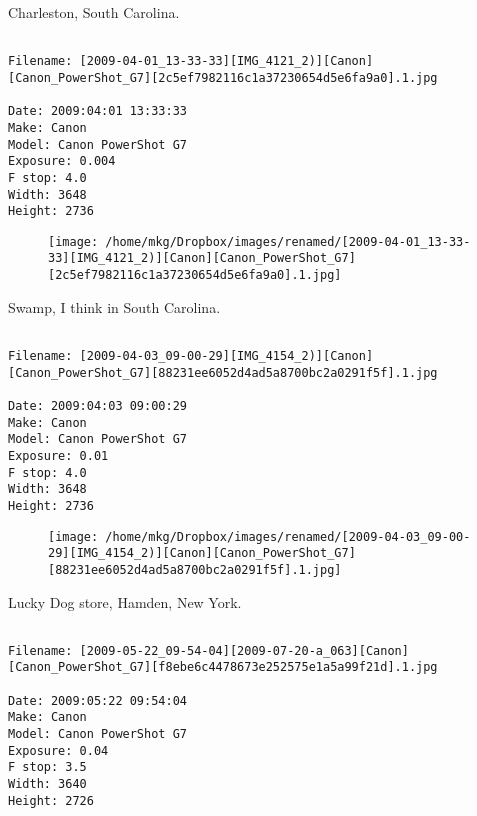 \clearpage
\onecolumn
\noindent Charleston, South Carolina.
\noindent
\begin{lstlisting}

Filename: [2009-04-01_13-33-33][IMG_4121_2)][Canon][Canon_PowerShot_G7][2c5ef7982116c1a37230654d5e6fa9a0].1.jpg

Date: 2009:04:01 13:33:33
Make: Canon
Model: Canon PowerShot G7
Exposure: 0.004
F stop: 4.0
Width: 3648
Height: 2736
\end{lstlisting}
\clearpage

\begin{figure}
\texttt{[image: /home/mkg/Dropbox/images/renamed/[2009-04-01\_13-33-33][IMG\_4121\_2)][Canon][Canon\_PowerShot\_G7][2c5ef7982116c1a37230654d5e6fa9a0].1.jpg]}
\end{figure}
    
\clearpage
\onecolumn
\noindent Swamp, I think in South Carolina.
\noindent
\begin{lstlisting}

Filename: [2009-04-03_09-00-29][IMG_4154_2)][Canon][Canon_PowerShot_G7][88231ee6052d4ad5a8700bc2a0291f5f].1.jpg

Date: 2009:04:03 09:00:29
Make: Canon
Model: Canon PowerShot G7
Exposure: 0.01
F stop: 4.0
Width: 3648
Height: 2736
\end{lstlisting}
\clearpage

\begin{figure}
\texttt{[image: /home/mkg/Dropbox/images/renamed/[2009-04-03\_09-00-29][IMG\_4154\_2)][Canon][Canon\_PowerShot\_G7][88231ee6052d4ad5a8700bc2a0291f5f].1.jpg]}
\end{figure}
    
\clearpage
\onecolumn
\noindent Lucky Dog store, Hamden, New York.
\noindent
\begin{lstlisting}

Filename: [2009-05-22_09-54-04][2009-07-20-a_063][Canon][Canon_PowerShot_G7][f8ebe6c4478673e252575e1a5a99f21d].1.jpg

Date: 2009:05:22 09:54:04
Make: Canon
Model: Canon PowerShot G7
Exposure: 0.04
F stop: 3.5
Width: 3640
Height: 2726
\end{lstlisting}
\clearpage

